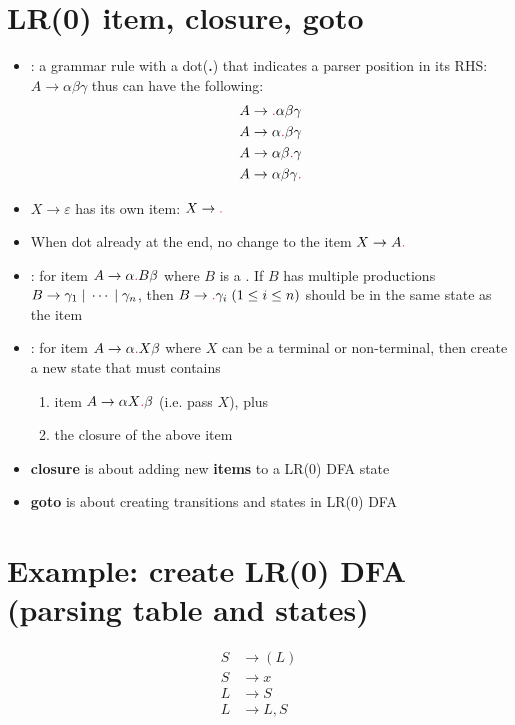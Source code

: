 \documentclass[10pt,a4paper,landscape]{article}
\begin{document}
\pagestyle{empty}

\begin{multicols*}{3}
\section*{LR(0) item, closure, goto}
\begin{itemize}
\item {}: a grammar rule with a dot(\textbf{.}) that indicates a
  parser position in its RHS: $A \to \alpha\beta\gamma$ thus can have the following:
  \begin{align*}
    A &\to \lrd\alpha\beta\gamma \\
    A &\to \alpha\lrd\beta\gamma \\
    A &\to \alpha\beta\lrd\gamma \\
    A &\to \alpha\beta\gamma\lrd
  \end{align*}
\item $X \to\varepsilon$ has its own item: $X\to\lrd$
\item When dot already at the end, no change to the item $X\to A\lrd$
\item {}: for item $A\to\alpha\lrd B\beta$ where $B$ is a . If $B$ has multiple productions $B\to \gamma_1 \;|\; \cdots \;|\; \gamma_n$, then  $B\to\lrd\gamma_i\;(1 \leq i \leq n)$ should be in the same state as the item
\item {}: for item $A\to\alpha\lrd X\beta$ where $X$ can be a terminal or non-terminal, then create a new state that must contains
  \begin{enumerate}
  \item item $A\to\alpha X\lrd\beta$ (i.e. pass $X$), plus
  \item the closure of the above item
  \end{enumerate}
\item \textbf{closure} is about adding new \textbf{items} to a LR(0) DFA state
\item \textbf{goto} is about creating transitions and states in LR(0) DFA
\end{itemize}
\section*{Example: create LR(0) DFA (parsing table and states)}
\begin{align*}
  S&\to (L)   \tag{1} \\
  S&\to x     \tag{2} \\
  L&\to S     \tag{3} \\
  L&\to L,S   \tag{4}
\end{align*}


\end{multicols*}
\end{document}
